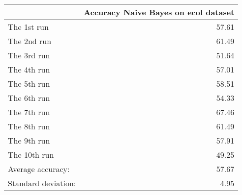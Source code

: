 \begin{tabular}{lr}
\toprule
{} &  Accuracy Naive Bayes on ecol dataset \\
\midrule
The 1st run         &                                 57.61 \\
The 2nd run         &                                 61.49 \\
The 3rd run         &                                 51.64 \\
The 4th run         &                                 57.01 \\
The 5th run         &                                 58.51 \\
The 6th run         &                                 54.33 \\
The 7th run         &                                 67.46 \\
The 8th run         &                                 61.49 \\
The 9th run         &                                 57.91 \\
The 10th run        &                                 49.25 \\
Average accuracy:   &                                 57.67 \\
Standard deviation: &                                  4.95 \\
\bottomrule
\end{tabular}
